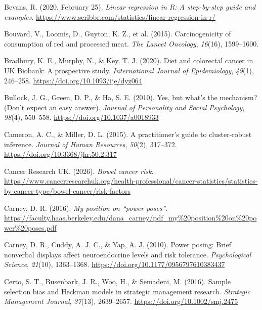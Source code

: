 \documentclass[
]{book}
\newlength{\cslhangindent}
\newenvironment{CSLReferences}[2] %
 {\begin{list}{}{%
  \setlength{\itemindent}{0pt}
  \setlength{\leftmargin}{0pt}
  \setlength{\parsep}{0pt}
  \ifodd #1
   \setlength{\leftmargin}{\cslhangindent}
   \setlength{\itemindent}{-1\cslhangindent}
  \fi
  \setlength{\itemsep}{#2\baselineskip}}}
 {\end{list}}
\begin{document}
\begin{CSLReferences}{1}{0}
Bevans, R. (2020, February 25). \emph{Linear regression in {R}: A step-by-step guide and examples}. \url{https://www.scribbr.com/statistics/linear-regression-in-r/}

{Bouvard, V., Loomis, D., Guyton, K. Z., et al.} (2015). Carcinogenicity of consumption of red and processed meat. \emph{The Lancet Oncology}, \emph{16}(16), 1599--1600.

Bradbury, K. E., Murphy, N., \& Key, T. J. (2020). Diet and colorectal cancer in {UK Biobank}: A prospective study. \emph{International Journal of Epidemiology}, \emph{49}(1), 246--258. \url{https://doi.org/10.1093/ije/dyz064}

Bullock, J. G., Green, D. P., \& Ha, S. E. (2010). Yes, but what's the mechanism? (Don't expect an easy answer). \emph{Journal of Personality and Social Psychology}, \emph{98}(4), 550--558. \url{https://doi.org/10.1037/a0018933}

Cameron, A. C., \& Miller, D. L. (2015). A practitioner's guide to cluster-robust inference. \emph{Journal of Human Resources}, \emph{50}(2), 317--372. \url{https://doi.org/10.3368/jhr.50.2.317}

Cancer Research UK. (2026). \emph{Bowel cancer risk}. \url{https://www.cancerresearchuk.org/health-professional/cancer-statistics/statistics-by-cancer-type/bowel-cancer/risk-factors}

Carney, D. R. (2016). \emph{My position on {``power poses''}}. \url{https://faculty.haas.berkeley.edu/dana_carney/pdf_my\%20position\%20on\%20power\%20poses.pdf}

Carney, D. R., Cuddy, A. J. C., \& Yap, A. J. (2010). Power posing: Brief nonverbal displays affect neuroendocrine levels and risk tolerance. \emph{Psychological Science}, \emph{21}(10), 1363--1368. \url{https://doi.org/10.1177/0956797610383437}

Certo, S. T., Busenbark, J. R., Woo, H., \& Semadeni, M. (2016). Sample selection bias and {Heckman} models in strategic management research. \emph{Strategic Management Journal}, \emph{37}(13), 2639--2657. \url{https://doi.org/10.1002/smj.2475}


\end{CSLReferences}
\end{document}
